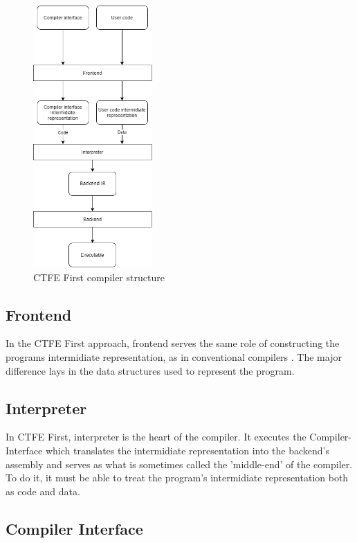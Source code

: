 \begin{figure}
	\includegraphics[height=10cm]{pictures/compiler-structure.png}
	\caption{CTFE First compiler structure}
	\label{CTFE-first-compiler-structure}
\end{figure}

\subsection{Frontend}
\label{frontend}

In the CTFE First approach, frontend serves the same role of constructing the programs intermidiate representation, as in conventional compilers \cite{puntambekar:compiler_design}.
The major difference lays in the data structures used to represent the program.

\subsection{Interpreter}
\label{interpreter}

In CTFE First, interpreter is the heart of the compiler.
It executes the Compiler-Interface which translates the intermidiate representation into the backend's assembly and serves as what is sometimes called the 'middle-end' of the compiler\cite{hsu2021llvm}.
To do it, it must be able to treat the program's intermidiate representation both as code and data.


\subsection{Compiler Interface} 
\label{compiler-interface}

